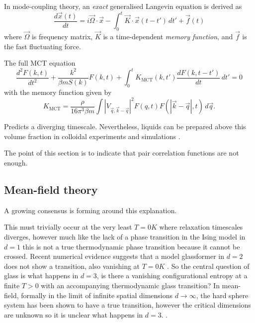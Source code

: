 In mode-coupling theory, an \emph{exact} generalised Langevin equation is derived as
\begin{equation}
  \frac{d \vec{x}(t)}{dt}
  =
  i \vec{\Omega} \cdot \vec{x}
  - \int_0^t \vec{K} \cdot \vec{x}(t - t') \, dt'
  + \vec{f}(t)
\end{equation}
where $\vec{\Omega}$ is frequency matrix, $\vec{K}$ is a time-dependent \emph{memory function}, and $\vec{f}$ is the fast fluctuating force.

\cite{ReichmanJSM2005, JanssenFP2018}

The full MCT equation
\begin{equation}
  \frac{d^2 F(k,t)}{d t^2}
  + \frac{k^2}{\beta m S(k)} F(k, t)
  + \int_0^t K_\mathrm{MCT}(k, t') \frac{d F(k, t - t')}{dt} \, dt'
  =
  0
\end{equation}
with the memory function given by
\begin{equation}
  K_\mathrm{MCT}
  =
  \frac{\rho}{16 \pi^3 \beta m}
  \int |V_{\vec{q},\vec{k}-\vec{q}}|^2
  F(q, t) F(|\vec{k} - \vec{q}|, t)
  \, d\vec{q}.
\end{equation}

Predicts a diverging timescale.
Nevertheless, liquids can be prepared above this volume fraction in colloidal experiments \cite{BrambillaPRL2009} and simulations \cite{BerthierPRL2016}.

The point of this section is to indicate that pair correlation functions are not enough.

\subsection{Mean-field theory}

A growing consensus is forming around this explanation.

This must trivially occur at the very least $T=0\si{K}$ where relaxation timescales diverges, however much like the lack of a phase transition in the Ising model in $d=1$ this is not a true thermodynamic phase transition because it cannot be crossed.
Recent numerical evidence suggests that a model glassformer in $d=2$ does not show a transition, also vanishing at $T=0\si{K}$ \cite{BerthierNC2019}.
So the central question of glass is what happens in $d=3$, is there a vanishing configurational entropy at a finite $T > 0$ with an accompanying thermodynamic glass transition?
In mean-field, formally in the limit of infinite spatial dimensions $d \to \infty$, the hard sphere system has been shown to have a true transition, however the critical dimensions are unknown so it is unclear what happens in $d=3$. \cite{KurchanJSM2012,KurchanJPCB2013,CharbonneauNC2014,CharbonneauJSM2014}.

